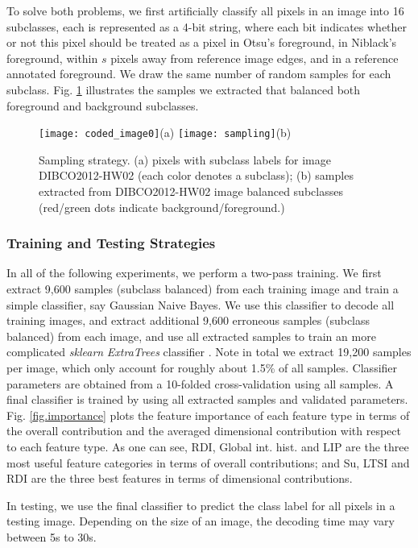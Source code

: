 \documentclass[onecolumn,11pt,draftcls,journal]{IEEEtran}
\begin{document}
To solve both problems, we first artificially classify all pixels in an image into 16 subclasses, each is represented as a 4-bit string, where each bit indicates whether or not this pixel should be treated as a pixel in Otsu's foreground, in Niblack's foreground, within $s$ pixels away from reference image edges, and in a reference annotated foreground. We draw the same number of random samples for each subclass. Fig. \ref{fig.sampling} illustrates the samples we extracted that balanced both foreground and background subclasses. 
\begin{figure}[!h]
\centering
\scriptsize
\texttt{[image: coded\_image0]}{(a)}
\texttt{[image: sampling]}{(b)}
\caption{Sampling strategy. (a) pixels with subclass labels for image DIBCO2012-HW02 (each color denotes a subclass); (b) samples extracted from DIBCO2012-HW02 image balanced subclasses (red/green dots indicate background/foreground.)}
\label{fig.sampling}
\end{figure}

\subsubsection{Training and Testing Strategies}
In all of the following experiments, we perform a two-pass training. We first extract 9,600 samples (subclass balanced) from each training image and train a simple classifier, say Gaussian Naive Bayes. We use this classifier to decode all training images, and extract additional 9,600 erroneous samples (subclass balanced) from each image, and use  all extracted samples to train an more complicated {\textsl{sklearn}} \cite{sklearn}{\textit{ ExtraTrees}} classifier \cite{geurts2006extremely}. Note in total we extract 19,200 samples per image, which only account for roughly about 1.5\% of all samples. Classifier parameters are obtained from a 10-folded cross-validation using all samples. A final classifier is trained by using all extracted samples and validated parameters. Fig. \ref{fig.importance} plots the feature importance of each feature type in terms of the overall contribution and the averaged dimensional contribution with respect to each feature type. As one can see, RDI, Global int. hist. and LIP are the three most useful feature categories in terms of overall contributions; and Su, LTSI and RDI are the three best features in terms of dimensional contributions. 

In testing, we use the final classifier to predict the class label for all pixels in a testing image. Depending on the size of an image, the decoding time may vary between 5s to 30s.
\end{document}

